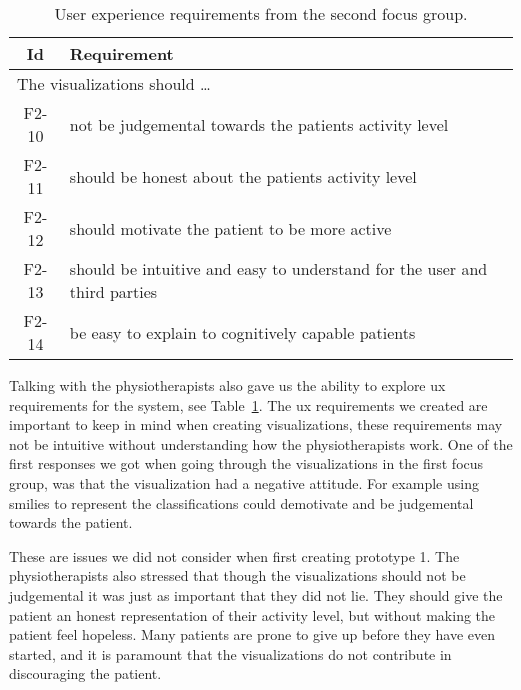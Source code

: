 \begin{table}[h!]
  \begin{center}
  \begin{tabular}{|c|p{12cm}|}
    \hline
      \textbf{Id} & \textbf{Requirement} \\ \hline
    \multicolumn{2}{|l|}{The visualizations should \ldots} \\ \hline
      F2-10 & not be judgemental towards the patients activity level \\ \hline
      F2-11 & should be honest about the patients activity level \\ \hline
      F2-12 & should motivate the patient to be more active \\ \hline
      F2-13 & should be intuitive and easy to understand for the user and third parties \\ \hline
      F2-14 & be easy to explain to cognitively capable patients \\ \hline
  \end{tabular}
  \end{center}
  \caption[User experience requirements after the second focus group.]{User experience requirements from the second focus group.}
  \label{tab:f2ReqUx}
\end{table}

Talking with the physiotherapists also gave us the ability to explore \gls{ux} requirements for the system, see Table~\ref{tab:f2ReqUx}. The \gls{ux} requirements we created are important to keep in mind when creating visualizations, these requirements may not be intuitive without understanding how the physiotherapists work. One of the first responses we got when going through the visualizations in the first focus group, was that the visualization had a negative attitude. For example using smilies to represent the classifications could demotivate and be judgemental towards the patient. 

These are issues we did not consider when first creating prototype 1. The physiotherapists also stressed that though the visualizations should not be judgemental it was just as important that they did not lie. They should give the patient an honest representation of their activity level, but without making the patient feel hopeless. Many patients are prone to give up before they have even started, and it is paramount that the visualizations do not contribute in discouraging the patient.

